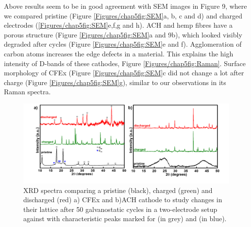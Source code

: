 Above results seem to be in good agreement with SEM images in Figure 9, where we compared pristine (Figure \ref{Figures/chap5fig:SEM}a, b, c and d) and charged electrodes (\ref{Figures/chap5fig:SEM}e,f,g and h). ACH and hemp fibres have a porous structure (Figure \ref{Figures/chap5fig:SEM}a and 9b), which looked visibly degraded after cycles (Figure \ref{Figures/chap5fig:SEM}e and f). Agglomeration of carbon atoms increases the edge defects in a material. This explains the high intensity of D-bands of these cathodes, Figure \ref{Figures/chap5fig:Raman}. Surface morphology of CFEx (Figure \ref{Figures/chap5fig:SEM}c did not change a lot after charge (Figure \ref{Figures/chap5fig:SEM}g), similar to our observations in its Raman spectra. 
\begin{figure}[tbh!]
  \centering
  \includegraphics[width=\textwidth]{Figures/chap5fig/xrd}
    \caption{XRD spectra comparing a pristine (black), charged (green) and discharged (red) a) CFEx and b)ACH cathode to study changes in their lattice after 50 galvanostatic cycles in a two-electrode setup against  with characteristic peaks marked for  (in grey) and  (in blue).}
  \label{Figures/chap5fig:xrd}
\end{figure}

